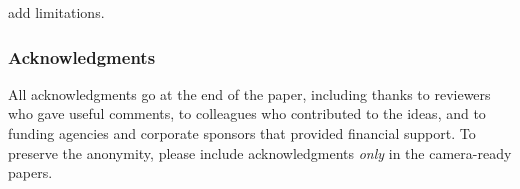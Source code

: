 \documentclass[twoside]{article}
\begin{document}
add limitations.

\subsubsection*{Acknowledgments}
All acknowledgments go at the end of the paper, including thanks to reviewers who gave useful comments, to colleagues who contributed to the ideas, and to funding agencies and corporate sponsors that provided financial support. 
To preserve the anonymity, please include acknowledgments \emph{only} in the camera-ready papers.


\end{document}
